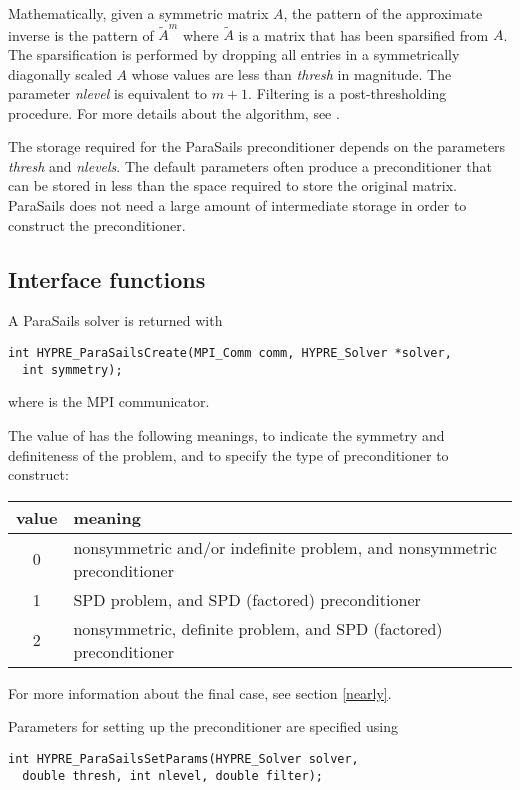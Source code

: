 Mathematically, given a symmetric matrix $A$, the pattern of the
approximate inverse is the pattern of $\tilde{A}^m$ where $\tilde{A}$
is a matrix that has been sparsified from $A$.  The sparsification
is performed by dropping all entries in a symmetrically diagonally scaled $A$
whose values are less than {\em thresh} in magnitude.  The parameter
{\em nlevel} is equivalent to $m+1$.
Filtering is a post-thresholding procedure.
For more details about the algorithm, see \cite{EChow_2000}.

The storage required for the ParaSails preconditioner depends on
the parameters {\em thresh} and {\em nlevels}.  The default parameters
often produce a preconditioner that can be stored in less than the
space required to store the original matrix.
ParaSails does not need a large amount of intermediate storage in
order to construct the preconditioner.


\subsection{Interface functions}

A ParaSails solver  is returned with 
\begin{display}
\begin{verbatim}
int HYPRE_ParaSailsCreate(MPI_Comm comm, HYPRE_Solver *solver,
  int symmetry);
\end{verbatim}
\end{display}
where  is the MPI communicator.

The value of  has the following meanings, to indicate
the symmetry and definiteness of the problem, and to specify the 
type of preconditioner to construct:
\begin{center}
\begin{tabular}{|c|l|} \hline
value & meaning \\ \hline
0 & nonsymmetric and/or indefinite problem, and nonsymmetric preconditioner \\
1 & SPD problem, and SPD (factored) preconditioner \\
2 & nonsymmetric, definite problem, and SPD (factored) preconditioner \\ 
\hline
\end{tabular}
\end{center}
For more information about the final case, see section \ref{nearly}.

Parameters for setting up the preconditioner are specified using
\begin{display}
\begin{verbatim}
int HYPRE_ParaSailsSetParams(HYPRE_Solver solver, 
  double thresh, int nlevel, double filter);
\end{verbatim}
\end{display}


